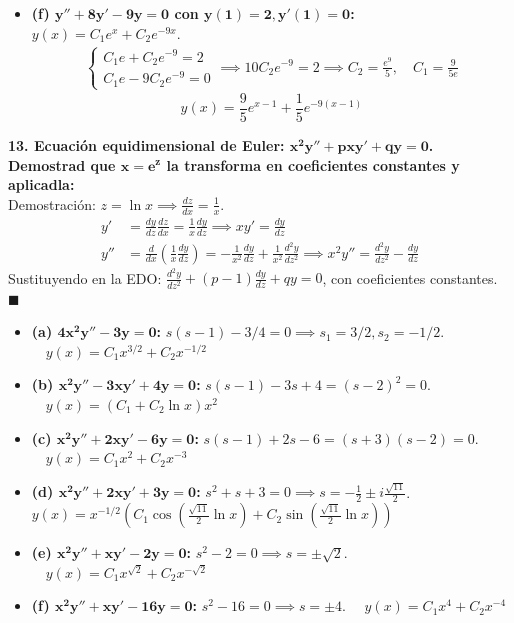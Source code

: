\documentclass[11pt, a4paper]{article}
\begin{document}
\begin{itemize}
\item \textbf{(f) $\bm{y''+8y'-9y=0}$ con $\bm{y(1)=2, y'(1)=0}$:} \\
$y(x) = C_1 e^x + C_2 e^{-9x}$.
\begin{align*}
\begin{cases} C_1 e + C_2 e^{-9} = 2 \\ C_1 e - 9C_2 e^{-9} = 0 \end{cases} \implies 10C_2 e^{-9} = 2 \implies C_2 = \frac{e^9}{5}, \quad C_1 = \frac{9}{5e}
\end{align*}
\[
\boxed{y(x) = \frac{9}{5}e^{x-1} + \frac{1}{5}e^{-9(x-1)}}
\]
\end{itemize}

\noindent\textbf{13. Ecuación equidimensional de Euler: $\bm{x^2y''+pxy'+qy=0}$. Demostrad que $\bm{x=e^z}$ la transforma en coeficientes constantes y aplicadla:} \\
Demostración: $z = \ln x \implies \frac{dz}{dx} = \frac{1}{x}$.
\begin{align*}
y' &= \frac{dy}{dz}\frac{dz}{dx} = \frac{1}{x}\frac{dy}{dz} \implies x y' = \frac{dy}{dz} \\
y'' &= \frac{d}{dx}\left(\frac{1}{x}\frac{dy}{dz}\right) = -\frac{1}{x^2}\frac{dy}{dz} + \frac{1}{x^2}\frac{d^2y}{dz^2} \implies x^2 y'' = \frac{d^2y}{dz^2} - \frac{dy}{dz}
\end{align*}
Sustituyendo en la EDO: $\frac{d^2y}{dz^2} + (p-1)\frac{dy}{dz} + qy = 0$, con coeficientes constantes. \quad $\blacksquare$

\begin{itemize}
\item \textbf{(a) $\bm{4x^2y''-3y=0}$:} $s(s-1) - 3/4 = 0 \implies s_1 = 3/2, s_2 = -1/2$. $\quad \boxed{y(x) = C_1 x^{3/2} + C_2 x^{-1/2}}$
\item \textbf{(b) $\bm{x^2y''-3xy'+4y=0}$:} $s(s-1) - 3s + 4 = (s-2)^2 = 0$. $\quad \boxed{y(x) = (C_1 + C_2 \ln x)x^2}$
\item \textbf{(c) $\bm{x^2y''+2xy'-6y=0}$:} $s(s-1) + 2s - 6 = (s+3)(s-2) = 0$. $\quad \boxed{y(x) = C_1 x^2 + C_2 x^{-3}}$
\item \textbf{(d) $\bm{x^2y''+2xy'+3y=0}$:} $s^2 + s + 3 = 0 \implies s = -\frac{1}{2} \pm i\frac{\sqrt{11}}{2}$. \\
$\boxed{y(x) = x^{-1/2}\left(C_1 \cos\left(\frac{\sqrt{11}}{2}\ln x\right) + C_2 \sin\left(\frac{\sqrt{11}}{2}\ln x\right)\right)}$
\item \textbf{(e) $\bm{x^2y''+xy'-2y=0}$:} $s^2 - 2 = 0 \implies s = \pm\sqrt{2}$. $\quad \boxed{y(x) = C_1 x^{\sqrt{2}} + C_2 x^{-\sqrt{2}}}$
\item \textbf{(f) $\bm{x^2y''+xy'-16y=0}$:} $s^2 - 16 = 0 \implies s = \pm 4$. $\quad \boxed{y(x) = C_1 x^4 + C_2 x^{-4}}$
\end{itemize}
\end{document}
